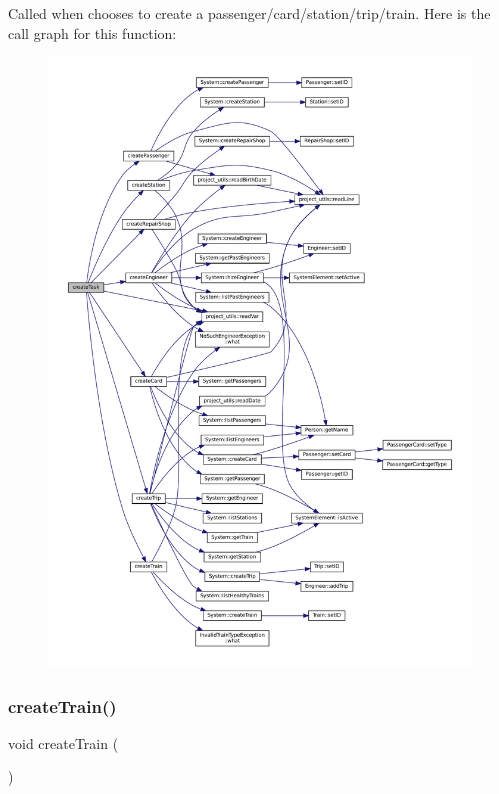 Called when chooses to create a passenger/card/station/trip/train. Here is the call graph for this function\+:
\nopagebreak
\begin{figure}[H]
\begin{center}
\leavevmode
\includegraphics[width=350pt]{Train-System_8cpp_ac6b62651f3428a773cc4b856d382d4ba_cgraph}
\end{center}
\end{figure}
\mbox{\label{Train-System_8cpp_ac6b94afb09ed41f340489a61f7349d3d}} 
\subsubsection{\texorpdfstring{create\+Train()}{createTrain()}}
{\footnotesize\ttfamily void create\+Train (\begin{DoxyParamCaption}{ }\end{DoxyParamCaption})}

